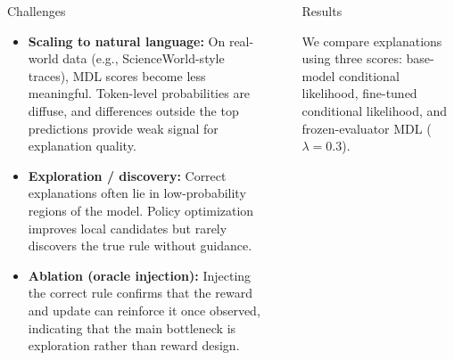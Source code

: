 \documentclass[final]{beamer}
\newlength{\sepwidth}
\newlength{\colwidth}
\newcommand{\separatorcolumn}{\begin{column}{\sepwidth}\end{column}}
\begin{document}
\begin{frame}[t]
\begin{columns}[t]
\begin{column}{\colwidth}
\begin{block}{Challenges}
\begin{itemize}
  \item \textbf{Scaling to natural language:}  
  On real-world data (e.g., ScienceWorld-style traces), MDL scores
  become less meaningful. Token-level probabilities are diffuse,
  and differences outside the top predictions provide weak signal
  for explanation quality.

  \item \textbf{Exploration / discovery:}  
  Correct explanations often lie in low-probability regions of the
  model. Policy optimization improves local candidates but rarely
  discovers the true rule without guidance.

  \item \textbf{Ablation (oracle injection):}  
  Injecting the correct rule confirms that the reward and update
  can reinforce it once observed, indicating that the main bottleneck
  is exploration rather than reward design.

\end{itemize}

\end{block}

\end{column}

\separatorcolumn

\begin{column}{\colwidth}



\begin{block}{Results}

\small

We compare explanations using three scores:
base-model conditional likelihood, fine-tuned conditional likelihood,
and frozen-evaluator MDL ($\lambda = 0.3$).

\begin{table}
\centering
\renewcommand{\arraystretch}{1.15}
\caption{Lower is better. MDL uses the frozen evaluator. Greedy decoding need not recover the globally lowest conditional-loss explanation.}
\end{table}


\end{block}
\end{column}
\end{columns}
\end{frame}
\end{document}

